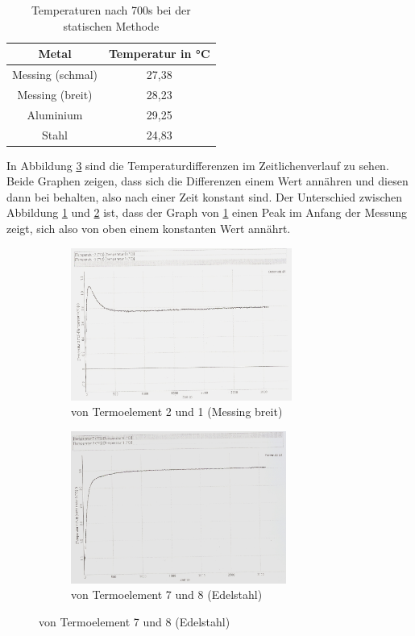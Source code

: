 \begin{table}
  \centering
  \caption{Temperaturen nach 700s bei der statischen Methode}
  \begin{tabular}{c c}
    \toprule
    Metal & Temperatur in \si{\celsius} \\
    \midrule
    Messing (schmal) & 27,38 \\
    Messing (breit) & 28,23 \\
    Aluminium & 29,25 \\
    Stahl & 24,83 \\
    \bottomrule
  \end{tabular}
  \label{tab:700s}
\end{table}
\FloatBarrier
In Abbildung \ref{fig:dt} sind die Temperaturdifferenzen im Zeitlichenverlauf zu
sehen. Beide Graphen zeigen, dass sich die Differenzen einem Wert annähren und
diesen dann bei behalten, also nach einer Zeit konstant sind.
Der Unterschied zwischen Abbildung \ref{fig:dt2t1} und \ref{fig:dt7t8} ist, dass
der Graph von \ref{fig:dt2t1} einen Peak im Anfang der Messung zeigt, sich also von
oben einem konstanten Wert annährt.
\begin{figure}
  \centering
  \caption{Zeitlicherverlauf der Temperaturdifferenzen}
  \begin{subfigure}{0.48\textwidth}
    \centering
    \includegraphics[height = 5cm, width = \textwidth]{logos/T2-T1.jpg}
    \caption{von Termoelement 2 und 1 (Messing breit)}
    \label{fig:dt2t1}
  \end{subfigure}
  \begin{subfigure}{0.48\textwidth}
    \centering
    \includegraphics[height=5cm, width = \textwidth]{logos/T7-T8.jpg}
    \caption{von Termoelement 7 und 8 (Edelstahl)}
    \label{fig:dt7t8}
  \end{subfigure}
  \label{fig:dt}
\end{figure}
